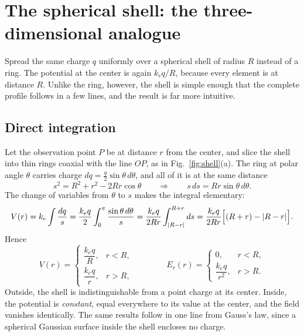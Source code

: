 \documentclass[11pt,a4paper]{article}
\newcommand{\ke}{k_e}
\begin{document}
\section{The spherical shell: the three-dimensional analogue}

Spread the same charge $q$ uniformly over a spherical shell of radius $R$ instead of a ring. The potential at the center is again $\ke q/R$, because every element is at distance $R$. Unlike the ring, however, the shell is simple enough that the complete profile follows in a few lines, and the result is far more intuitive.

\subsection{Direct integration}

Let the observation point $P$ be at distance $r$ from the center, and slice the shell into thin rings coaxial with the line $OP$, as in Fig.~\ref{fig:shell}(a). The ring at polar angle $\theta$ carries charge $dq=\tfrac{q}{2}\sin\theta\,d\theta$, and all of it is at the same distance
\begin{equation}
s^2 = R^2 + r^2 - 2Rr\cos\theta
\qquad\Longrightarrow\qquad
s\,ds = Rr\sin\theta\,d\theta .
\end{equation}
The change of variables from $\theta$ to $s$ makes the integral elementary:
\begin{equation}
V(r) = \ke\int\frac{dq}{s}
= \frac{\ke q}{2}\int_0^\pi\frac{\sin\theta\,d\theta}{s}
= \frac{\ke q}{2Rr}\int_{\abs{R-r}}^{R+r} ds
= \frac{\ke q}{2Rr}\Big[(R+r)-\abs{R-r}\Big].
\end{equation}
Hence
\begin{equation}
V(r)=
\begin{cases}
\dfrac{\ke q}{R}, & r<R,\\[10pt]
\dfrac{\ke q}{r}, & r>R,
\end{cases}
\qquad\qquad
E_r(r)=
\begin{cases}
0, & r<R,\\[6pt]
\dfrac{\ke q}{r^2}, & r>R.
\end{cases}
\label{eq:shell}
\end{equation}
Outside, the shell is indistinguishable from a point charge at its center. Inside, the potential is \emph{constant}, equal everywhere to its value at the center, and the field vanishes identically. The same results follow in one line from Gauss's law, since a spherical Gaussian surface inside the shell encloses no charge.
\end{document}
